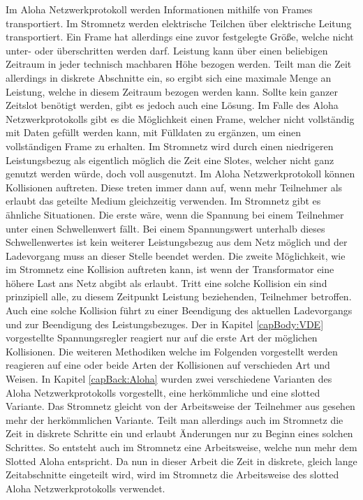 Im Aloha Netzwerkprotokoll werden Informationen mithilfe von Frames transportiert. Im Stromnetz werden elektrische Teilchen über elektrische Leitung transportiert. Ein Frame hat allerdings eine zuvor festgelegte Größe, welche nicht unter- oder überschritten werden darf. Leistung kann über einen beliebigen Zeitraum in jeder technisch machbaren Höhe bezogen werden. Teilt man die Zeit allerdings in diskrete Abschnitte ein, so ergibt sich eine maximale Menge an Leistung, welche in diesem Zeitraum bezogen werden kann. Sollte kein ganzer Zeitslot benötigt werden, gibt es jedoch auch eine Lösung. Im Falle des Aloha Netzwerkprotokolls gibt es die Möglichkeit einen Frame, welcher nicht vollständig mit Daten gefüllt werden kann, mit Fülldaten zu ergänzen, um einen vollständigen Frame zu erhalten. Im Stromnetz wird durch einen niedrigeren Leistungsbezug als eigentlich möglich die Zeit eine Slotes, welcher nicht ganz genutzt werden würde, doch voll ausgenutzt. Im Aloha Netzwerkprotokoll können Kollisionen auftreten. Diese treten immer dann auf, wenn mehr Teilnehmer als erlaubt das geteilte Medium gleichzeitig verwenden. Im Stromnetz gibt es ähnliche Situationen. Die erste wäre, wenn die Spannung bei einem Teilnehmer unter einen Schwellenwert fällt. Bei einem Spannungswert unterhalb dieses Schwellenwertes ist kein weiterer Leistungsbezug aus dem Netz möglich und der Ladevorgang muss an dieser Stelle beendet werden. Die zweite Möglichkeit, wie im Stromnetz eine Kollision auftreten kann, ist wenn der Transformator eine höhere Last ans Netz abgibt als erlaubt. Tritt eine solche Kollision ein sind prinzipiell alle, zu diesem Zeitpunkt Leistung beziehenden, Teilnehmer betroffen. Auch eine solche Kollision führt zu einer Beendigung des aktuellen Ladevorgangs und zur Beendigung des Leistungsbezuges. Der in Kapitel \ref{capBody:VDE} vorgestellte Spannungsregler reagiert nur auf die erste Art der möglichen Kollisionen. Die weiteren Methodiken welche im Folgenden vorgestellt werden reagieren auf eine oder beide Arten der Kollisionen auf verschieden Art und Weisen.
In Kapitel \ref{capBack:Aloha} wurden zwei verschiedene Varianten des Aloha Netzwerkprotokolls vorgestellt, eine herkömmliche und eine slotted Variante. Das Stromnetz gleicht von der Arbeitsweise der Teilnehmer aus gesehen mehr der herkömmlichen Variante. Teilt man allerdings auch im Stromnetz die Zeit in diskrete Schritte ein und erlaubt Änderungen nur zu Beginn eines solchen Schrittes. So entsteht auch im Stromnetz eine Arbeitsweise, welche nun mehr dem Slotted Aloha entspricht. Da nun in dieser Arbeit die Zeit in diskrete, gleich lange Zeitabschnitte eingeteilt wird, wird im Stromnetz die Arbeitsweise des slotted Aloha Netzwerkprotokolls verwendet.

